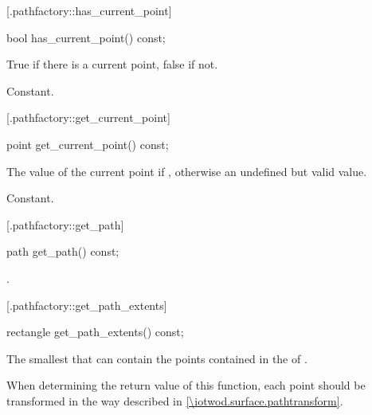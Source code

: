  [\iotwod.pathfactory::has_current_point] 
{}

%
%
\begin{itemdecl}
bool has_current_point() const;
\end{itemdecl}
\begin{itemdescr}
	\pnum
	\returns
	True if there is a current point, false if not.
	
	\pnum
	\complexity
	Constant.
\end{itemdescr}

 [\iotwod.pathfactory::get_current_point] 
{}

%
%
\begin{itemdecl}
point get_current_point() const;
\end{itemdecl}
\begin{itemdescr}
	\pnum
	\returns
	The value of the current point if , 
	otherwise an undefined but valid value.
	
	\pnum
	\complexity
	Constant.
\end{itemdescr}

 [\iotwod.pathfactory::get_path] {}

%
%
\begin{itemdecl}
path get_path() const;
\end{itemdecl}
\begin{itemdescr}
	\pnum
	\returns
	.
\end{itemdescr}

 [\iotwod.pathfactory::get_path_extents] 
{}

%
%
\begin{itemdecl}
rectangle get_path_extents() const;
\end{itemdecl}
\begin{itemdescr}
	\pnum
	\returns
	The smallest  that can contain the points contained in the 
	 of .
	
	\pnum
	\remarks
	When determining the return value of this function, each point should be 
	transformed in the way described in \ref{\iotwod.surface.pathtransform}.
\end{itemdescr}

